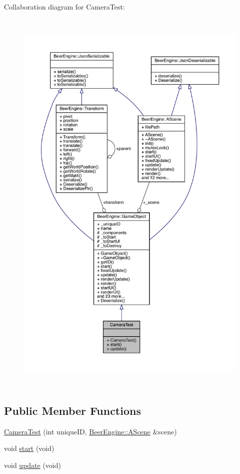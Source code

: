 Collaboration diagram for Camera\+Test\+:
\nopagebreak
\begin{figure}[H]
\begin{center}
\leavevmode
\includegraphics[height=550pt]{class_camera_test__coll__graph}
\end{center}
\end{figure}
\subsection*{Public Member Functions}
\begin{DoxyCompactItemize}
\item 
\mbox{\hyperlink{class_camera_test_a87bcce0ea69a1a731e9e7743ecff602f}{Camera\+Test}} (int unique\+ID, \mbox{\hyperlink{class_beer_engine_1_1_a_scene}{Beer\+Engine\+::\+A\+Scene}} \&scene)
\item 
void \mbox{\hyperlink{class_camera_test_a33618b16d2906b67b68e55ad15a8a33b}{start}} (void)
\item 
void \mbox{\hyperlink{class_camera_test_a5bacc3399e57aa311e8d5ea39c9865bf}{update}} (void)
\end{DoxyCompactItemize}
